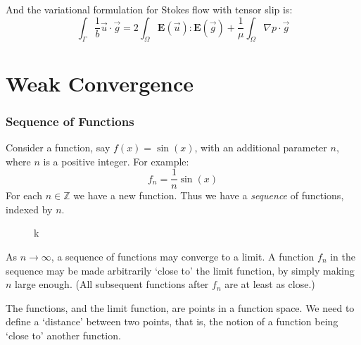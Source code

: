 \documentclass[12pt, a4paper, twoside, openright]{book}
\begin{document}
\vspace*{1em}
And the variational formulation for Stokes flow with tensor slip is:
\begin{equation}
\int_{\Gamma} \frac{1}{b} \vec{u} \cdot \vec{g} = 
2 \int_{\Omega} \mathbf{E}(\vec{u}) : \mathbf{E}(\vec{g}) +
\frac{1}{\mu} \int_{\Omega}  \nabla p \cdot \vec{g}
\end{equation}


\section*{Weak Convergence}

\subsubsection*{Sequence of Functions}

Consider a function, say $f(x) = \sin(x)$, with an additional parameter $n$, where $n$ is a positive integer.  For example:
\begin{equation}
f_n = \frac{1}{n} \sin (x)
\end{equation}
For each $n \in \mathbb{Z}$ we have a new function.  Thus we have a \emph{sequence} of functions, indexed by $n$.

\begin{figure}[ht]
\centering
{}
\caption{k}\label{k}
\end{figure}

As $n \rightarrow \infty$, a sequence of functions may converge to a limit. 
A function $f_n$ in the sequence may be made arbitrarily `close to' the limit function, by simply making $n$ large enough. (All subsequent functions after $f_n$ are at least as close.)

The functions, and the limit function, are points in a function space.  We need to define a `distance' between two points, that is, the notion of a function being `close to' another function.
\end{document}
